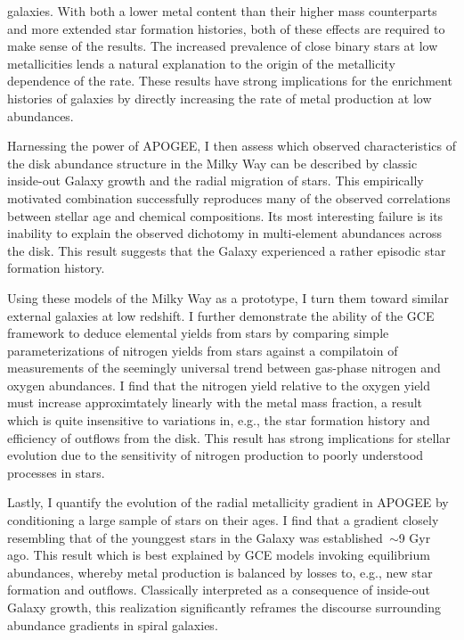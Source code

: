 \documentclass[main.tex]{subfiles}
\begin{document}
\begin{doublespace}
galaxies.
With both a lower metal content than their higher mass counterparts and more
extended star formation histories, both of these effects are required to
make sense of the results.
The increased prevalence of close binary stars at low metallicities lends a
natural explanation to the origin of the metallicity dependence of the rate.
These results have strong implications for the enrichment histories of galaxies
by directly increasing the rate of metal production at low abundances.
\par
Harnessing the power of APOGEE, I then assess which observed characteristics of
the disk abundance structure in the Milky Way can be described by classic
inside-out Galaxy growth and the radial migration of stars.
This empirically motivated combination successfully reproduces many of the
observed correlations between stellar age and chemical compositions.
Its most interesting failure is its inability to explain the observed dichotomy
in multi-element abundances across the disk.
This result suggests that the Galaxy experienced a rather episodic star
formation history.
\par
Using these models of the Milky Way as a prototype, I turn them toward similar
external galaxies at low redshift.
I further demonstrate the ability of the GCE framework to deduce elemental
yields from stars by comparing simple parameterizations of nitrogen yields from
stars against a compilatoin of measurements of the seemingly universal trend
between gas-phase nitrogen and oxygen abundances.
I find that the nitrogen yield relative to the oxygen yield must increase
approximtately linearly with the metal mass fraction, a result which is quite
insensitive to variations in, e.g., the star formation history and efficiency
of outflows from the disk.
This result has strong implications for stellar evolution due to the sensitivity
of nitrogen production to poorly understood processes in stars.
\par
Lastly, I quantify the evolution of the radial metallicity gradient in APOGEE
by conditioning a large sample of stars on their ages.
I find that a gradient closely resembling that of the younggest stars in the
Galaxy was established~$\sim$9 Gyr ago.
This result which is best explained by GCE models invoking equilibrium
abundances, whereby metal production is balanced by losses to, e.g., new star
formation and outflows.
Classically interpreted as a consequence of inside-out Galaxy growth, this
realization significantly reframes the discourse surrounding abundance
gradients in spiral galaxies.

\end{doublespace}
\end{document}
